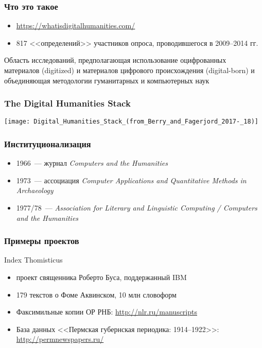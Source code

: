 \begin{frame}
  \frametitle{Что это такое}

  \begin{itemize}
    \item \url{https://whatisdigitalhumanities.com/}
    \item 817 <<определений>> участников опроса, проводившегося в 2009--2014 гг.
  \end{itemize}

  \begin{block}{}
    Область исследований, предполагающая использование оцифрованных материалов (digitized) и материалов цифрового происхождения (digital-born) и объединяющая методологии гуманитарных и компьютерных наук
  \end{block}
\end{frame}

\begin{frame}
  \frametitle{The Digital Humanities Stack}
  \centering
  \texttt{[image: Digital\_Humanities\_Stack\_(from\_Berry\_and\_Fagerjord\_2017-\_18)]}
\end{frame}

\begin{frame}
  \frametitle{Институционализация}

  \begin{itemize}
    \item 1966~--- журнал \textit{Computers and the Humanities}
    \item 1973~--- ассоциация \textit{Computer Applications and Quantitative Methods in Archaeology}
    \item 1977/78~--- \textit{Association for Literary and Linguistic Computing / Computers and the Humanities}
  \end{itemize}
\end{frame}

\begin{frame}
  \frametitle{Примеры проектов}

  \begin{block}{Index Thomisticus}
    \begin{itemize}
      \item проект священника Роберто Буса, поддержанный IBM
      \item 179 текстов о Фоме Аквинском, 10 млн словоформ
    \end{itemize}
  \end{block}

  \vfill

  \begin{itemize}
    \item Факсимильные копии ОР РНБ: \linebreak \url{http://nlr.ru/manuscripts}
    \item База данных <<Пермская губернская периодика: 1914--1922>>: \linebreak \url{http://permnewspapers.ru/}
  \end{itemize}
\end{frame}

